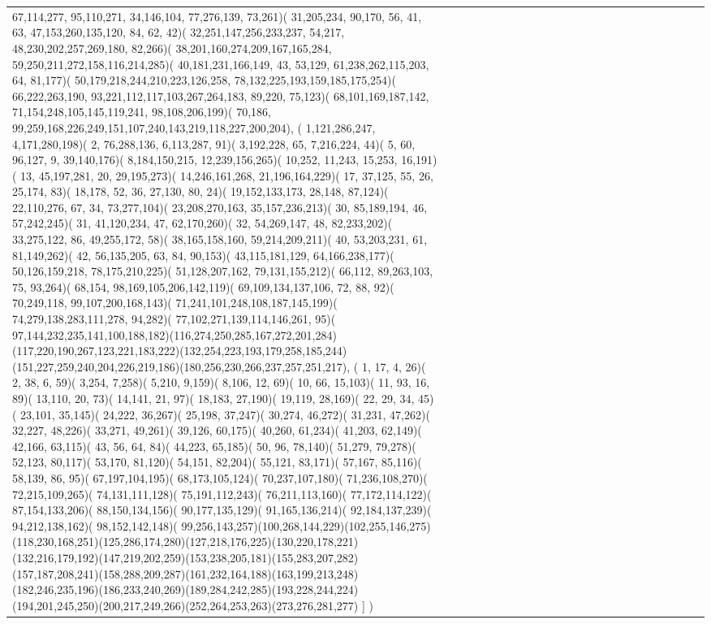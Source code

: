 \documentclass[varwidth=\maxdimen,border=10]{standalone}
\begin{document}
\begin{tabular}{@{}l@{}l@{}l@{}l@{}l@{}l@{}l@{}l@{}l@{}l@{}l@{}l@{}l@{}l@{}l@{}l@{}l@{}l@{}l@{}l@{}l@{}l@{}l@{}l@{}}
67,114,277, 95,110,271, 34,146,104, 77,276,139, 73,261)( 31,205,234, 90,170, 56, 41, 63, 47,153,260,135,120, 84, 62, 42)( 32,251,147,256,233,237, 54,217, 48,230,202,257,269,180, 82,266)( 38,201,160,274,209,167,165,284, 59,250,211,272,158,116,214,285)( 40,181,231,166,149, 43, 53,129, 61,238,262,115,203, 64, 81,177)( 50,179,218,244,210,223,126,258, 78,132,225,193,159,185,175,254)( 66,222,263,190, 93,221,112,117,103,267,264,183, 89,220, 75,123)( 68,101,169,187,142, 71,154,248,105,145,119,241, 98,108,206,199)( 70,186, 99,259,168,226,249,151,107,240,143,219,118,227,200,204), (  1,121,286,247,  4,171,280,198)(  2, 76,288,136,  6,113,287, 91)(  3,192,228, 65,  7,216,224, 44)(  5, 60, 96,127,  9, 39,140,176)(  8,184,150,215, 12,239,156,265)( 10,252, 11,243, 15,253, 16,191)( 13, 45,197,281, 20, 29,195,273)( 14,246,161,268, 21,196,164,229)( 17, 37,125, 55, 26, 25,174, 83)( 18,178, 52, 36, 27,130, 80, 24)( 19,152,133,173, 28,148, 87,124)( 22,110,276, 67, 34, 73,277,104)( 23,208,270,163, 35,157,236,213)( 30, 85,189,194, 46, 57,242,245)( 31, 41,120,234, 47, 62,170,260)( 32, 54,269,147, 48, 82,233,202)( 33,275,122, 86, 49,255,172, 58)( 38,165,158,160, 59,214,209,211)( 40, 53,203,231, 61, 81,149,262)( 42, 56,135,205, 63, 84, 90,153)( 43,115,181,129, 64,166,238,177)( 50,126,159,218, 78,175,210,225)( 51,128,207,162, 79,131,155,212)( 66,112, 89,263,103, 75, 93,264)( 68,154, 98,169,105,206,142,119)( 69,109,134,137,106, 72, 88, 92)( 70,249,118, 99,107,200,168,143)( 71,241,101,248,108,187,145,199)( 74,279,138,283,111,278, 94,282)( 77,102,271,139,114,146,261, 95)( 97,144,232,235,141,100,188,182)(116,274,250,285,167,272,201,284)(117,220,190,267,123,221,183,222)(132,254,223,193,179,258,185,244)(151,227,259,240,204,226,219,186)(180,256,230,266,237,257,251,217), (  1, 17,  4, 26)(  2, 38,  6, 59)(  3,254,  7,258)(  5,210,  9,159)(  8,106, 12, 69)( 10, 66, 15,103)( 11, 93, 16, 89)( 13,110, 20, 73)( 14,141, 21, 97)( 18,183, 27,190)( 19,119, 28,169)( 22, 29, 34, 45)( 23,101, 35,145)( 24,222, 36,267)( 25,198, 37,247)( 30,274, 46,272)( 31,231, 47,262)( 32,227, 48,226)( 33,271, 49,261)( 39,126, 60,175)( 40,260, 61,234)( 41,203, 62,149)( 42,166, 63,115)( 43, 56, 64, 84)( 44,223, 65,185)( 50, 96, 78,140)( 51,279, 79,278)( 52,123, 80,117)( 53,170, 81,120)( 54,151, 82,204)( 55,121, 83,171)( 57,167, 85,116)( 58,139, 86, 95)( 67,197,104,195)( 68,173,105,124)( 70,237,107,180)( 71,236,108,270)( 72,215,109,265)( 74,131,111,128)( 75,191,112,243)( 76,211,113,160)( 77,172,114,122)( 87,154,133,206)( 88,150,134,156)( 90,177,135,129)( 91,165,136,214)( 92,184,137,239)( 94,212,138,162)( 98,152,142,148)( 99,256,143,257)(100,268,144,229)(102,255,146,275)(118,230,168,251)(125,286,174,280)(127,218,176,225)(130,220,178,221)(132,216,179,192)(147,219,202,259)(153,238,205,181)(155,283,207,282)(157,187,208,241)(158,288,209,287)(161,232,164,188)(163,199,213,248)(182,246,235,196)(186,233,240,269)(189,284,242,285)(193,228,244,224)(194,201,245,250)(200,217,249,266)(252,264,253,263)(273,276,281,277) ] )

\end{tabular}
\end{document}
